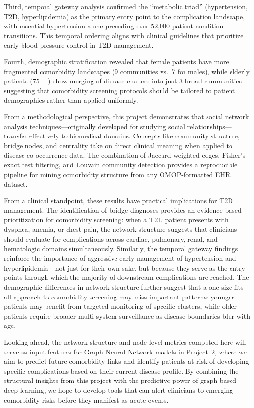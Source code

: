 \documentclass[10pt,twocolumn]{article}
\begin{document}
Third, temporal gateway analysis confirmed the ``metabolic triad'' (hypertension, T2D, hyperlipidemia) as the primary entry point to the complication landscape, with essential hypertension alone preceding over 52,000 patient-condition transitions.
This temporal ordering aligns with clinical guidelines that prioritize early blood pressure control in T2D management.

Fourth, demographic stratification revealed that female patients have more fragmented comorbidity landscapes (9 communities vs.\ 7 for males), while elderly patients ($75+$) show merging of disease clusters into just 3 broad communities---suggesting that comorbidity screening protocols should be tailored to patient demographics rather than applied uniformly.

From a methodological perspective, this project demonstrates that social network analysis techniques---originally developed for studying social relationships---transfer effectively to biomedical domains.
Concepts like community structure, bridge nodes, and centrality take on direct clinical meaning when applied to disease co-occurrence data.
The combination of Jaccard-weighted edges, Fisher's exact test filtering, and Louvain community detection provides a reproducible pipeline for mining comorbidity structure from any OMOP-formatted EHR dataset.

From a clinical standpoint, these results have practical implications for T2D management.
The identification of bridge diagnoses provides an evidence-based prioritization for comorbidity screening: when a T2D patient presents with dyspnea, anemia, or chest pain, the network structure suggests that clinicians should evaluate for complications across cardiac, pulmonary, renal, and hematologic domains simultaneously.
Similarly, the temporal gateway findings reinforce the importance of aggressive early management of hypertension and hyperlipidemia---not just for their own sake, but because they serve as the entry points through which the majority of downstream complications are reached.
The demographic differences in network structure further suggest that a one-size-fits-all approach to comorbidity screening may miss important patterns: younger patients may benefit from targeted monitoring of specific clusters, while older patients require broader multi-system surveillance as disease boundaries blur with age.

Looking ahead, the network structure and node-level metrics computed here will serve as input features for Graph Neural Network models in Project~2, where we aim to predict future comorbidity links and identify patients at risk of developing specific complications based on their current disease profile.
By combining the structural insights from this project with the predictive power of graph-based deep learning, we hope to develop tools that can alert clinicians to emerging comorbidity risks before they manifest as acute events.
\end{document}

